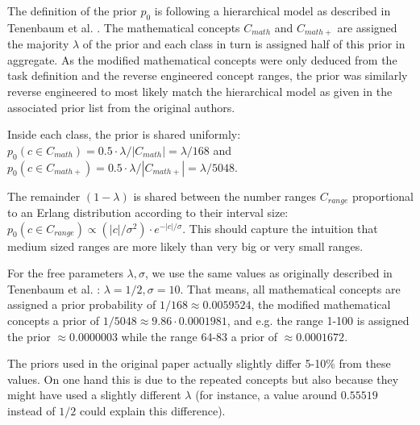 The definition of the prior $p_0$ is following a hierarchical model as described in Tenenbaum et al. \cite{tenenbaum2000rules}. 
The mathematical concepts $C_{math}$ and $C_{math+}$ are assigned the majority $\lambda$ of the prior and each class in turn is assigned half of this prior in aggregate. As the modified mathematical concepts were only deduced from the task definition and the reverse engineered concept ranges, the prior was similarly reverse engineered to most likely match the hierarchical model as given in the associated prior list from the original authors.

Inside each class, the prior is shared uniformly: $p_0(c \in C_{math}) = 0.5 \cdot \lambda / |C_{math}|= \lambda / 168$ and $p_0(c \in C_{math+}) = 0.5 \cdot \lambda / |C_{math+}|= \lambda / 5048$. 

The remainder $(1 - \lambda)$ is shared between the number ranges $C_{range}$ proportional to an Erlang distribution according to their interval size: $p_0(c \in C_{range}) \propto (|c|/\sigma^2) \cdot e^{-|c|/\sigma}$. This should capture the intuition that medium sized ranges are more likely than very big or very small ranges.

For the free parameters $\lambda, \sigma$, we use the same values as originally described in Tenenbaum et al. \cite{tenenbaum2000rules}: $\lambda = 1/2, \sigma = 10$. 
That means, all mathematical concepts are assigned a prior probability of $1/168 \approx 0.0059524$, the modified mathematical concepts a prior of $1/5048 \approx 9.86 \cdot 0.0001981$, and e.g. the range 1-100 is assigned the prior $\approx 0.0000003$ while the range 64-83 a prior of $\approx 0.0001672$. 

The priors used in the original paper actually slightly differ 5-10\% from these values. On one hand this is due to the repeated concepts but also because they might have used a slightly different $\lambda$ (for instance, a value around $0.55519$ instead of $1/2$ could explain this difference).

